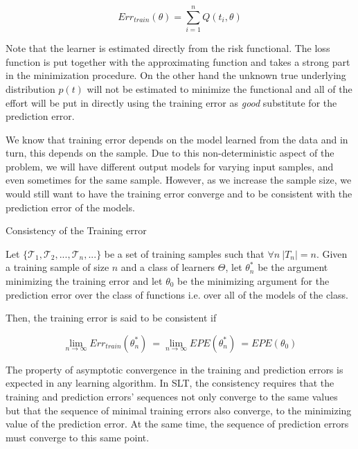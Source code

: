 \begin{equation}\label{vapnik-empiricalRisk}
Err_{train}(\theta) =  \sum_{i=1}^n Q(t_i,\theta)
\end{equation}

Note that the learner is estimated directly from the risk functional. The loss function is put together with the approximating function and takes a strong part in the minimization procedure. On the other hand the unknown true underlying distribution $p(t)$ will not be estimated to minimize the functional and all of the effort will be put in directly using the training error as \textit{good} substitute for the prediction error.


We know that  training error depends on the model learned from the data and in turn, this depends on the sample. Due to this non-deterministic aspect of the problem, we will have different output  models for varying input samples, and even sometimes for the same sample. However, as we increase the sample size, we would still want to have the training error converge and to be consistent with the prediction error of the models.



\begin{definition}{Consistency of the Training error}

Let $\{\mathcal {T}_1, \mathcal {T}_2, ..., \mathcal {T}_n, ...  \}$ be a set of training samples such that $\forall n \ |T_n|=n$. Given a training sample of size $n$ and a class of learners $\Theta$, let $\theta^{*}_n$ be the argument minimizing the training error and let $\theta_0$ be the minimizing argument for the prediction error over the class of functions i.e. over all of the models of the class.

Then, the training error is said to be consistent if

$$\lim_{n\to\infty} Err_{train}(\theta^{*}_n) \  = \lim_{n\to\infty} EPE(\theta^{*}_n) \ =  EPE(\theta_0)$$

\end{definition}

The property of asymptotic convergence in the training and prediction errors is expected in any learning algorithm. In SLT, the consistency requires that the training and prediction errors'  sequences not only converge to the same values but that the sequence of minimal training errors also converge, to the minimizing value of the prediction error. At the same time, the sequence of prediction errors must converge to this same point.

